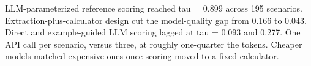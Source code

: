 LLM-parameterized reference scoring reached tau = 0.899 across 195 scenarios.
Extraction-plus-calculator design cut the model-quality gap from 0.166 to 0.043.
Direct and example-guided LLM scoring lagged at tau = 0.093 and 0.277.
One API call per scenario, versus three, at roughly one-quarter the tokens.
Cheaper models matched expensive ones once scoring moved to a fixed calculator.
